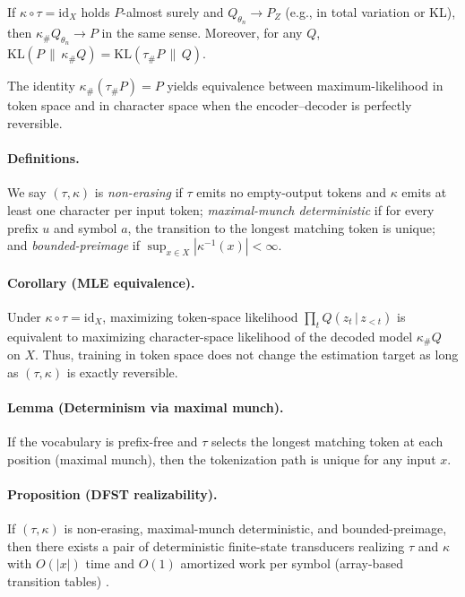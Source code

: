 \makeatletter
{}
\makeatother

\begin{theorem}\label{thm:consistency}
If $\kappa\circ\tau=\mathrm{id}_X$ holds $P$-almost surely and $Q_{\theta_n}\to P_Z$ (e.g., in total variation or KL), then $\kappa_{\#}Q_{\theta_n}\to P$ in the same sense. Moreover, for any $Q$, $\mathrm{KL}(P\,\|\,\kappa_{\#}Q)=\mathrm{KL}(\tau_{\#}P\,\|\,Q)$.
\end{theorem}

\noindent The identity $\kappa_{\#}(\tau_{\#}P)=P$ yields equivalence between maximum-likelihood in token space and in character space when the encoder–decoder is perfectly reversible.

\paragraph{Definitions.}
We say $(\tau,\kappa)$ is \emph{non-erasing} if $\tau$ emits no empty-output tokens and $\kappa$ emits at least one character per input token; \emph{maximal-munch deterministic} if for every prefix $u$ and symbol $a$, the transition to the longest matching token is unique; and \emph{bounded-preimage} if $\sup_{x\in X}|\kappa^{-1}(x)|<\infty$.

\paragraph{Corollary (MLE equivalence).}
Under $\kappa\circ\tau=\mathrm{id}_X$, maximizing token-space likelihood $\prod_t Q(z_t\,|\,z_{<t})$ is equivalent to maximizing character-space likelihood of the decoded model $\kappa_{\#}Q$ on $X$.
Thus, training in token space does not change the estimation target as long as $(\tau,\kappa)$ is exactly reversible.

\paragraph{Lemma (Determinism via maximal munch).}
If the vocabulary is prefix-free and $\tau$ selects the longest matching token at each position (maximal munch), then the tokenization path is unique for any input $x$.

\paragraph{Proposition (DFST realizability).}
If $(\tau,\kappa)$ is non-erasing, maximal-munch deterministic, and bounded-preimage, then there exists a pair of deterministic finite-state transducers realizing $\tau$ and $\kappa$ with $O(|x|)$ time and $O(1)$ amortized work per symbol (array-based transition tables) \citep{Mohri2004FST, Roark2011GrammarTokenization}.

